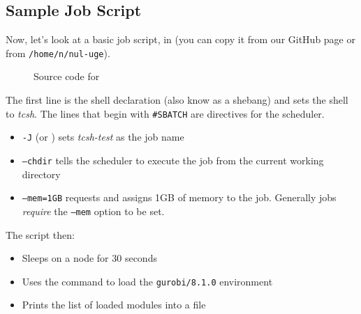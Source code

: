 \subsection{Sample Job Script}

Now, let's look at a basic job script,  in 
(you can copy it from our GitHub page or from \texttt{/home/n/nul-uge}).

\begin{figure}[htpb]
	
	\caption{Source code for }
	\label{fig:tcsh.sh}
\end{figure}

The first line is the shell declaration (also know as a shebang) and sets the shell to \emph{tcsh}.
The lines that begin with \texttt{\#SBATCH} are directives for the scheduler.

\begin{itemize}
	\item \texttt{-J} (or ) sets \emph{tcsh-test} as the job name
	\item \texttt{--chdir} tells the scheduler to execute the job from the current working directory
	\item \texttt{--mem=1GB} requests and assigns 1GB of memory to the job. 
	Generally jobs \emph{require} the \texttt{--mem} option to be set.
\end{itemize}

The script then:

\begin{itemize}
	\item Sleeps on a node for 30 seconds
	\item Uses the  command to load the \texttt{gurobi/8.1.0} environment
	\item Prints the list of loaded modules into a file
\end{itemize}


